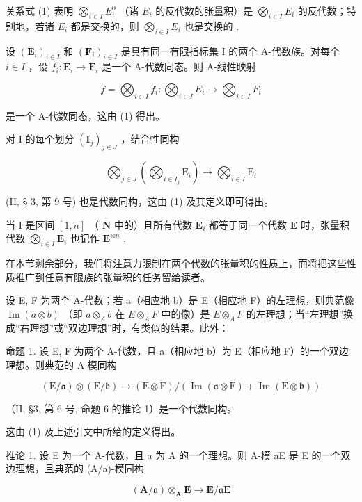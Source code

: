 关系式 (1) 表明 \(\bigotimes_{i\in I}E_i^0\) （诸 \(E_{i}\) 的反代数的张量积）是 \(\bigotimes_{i\in I}E_{i}\) 的反代数；特别地，若诸 \(E_{i}\) 都是交换的，则 \(\bigotimes_{i\in I}E_{i}\) 也是交换的 .

设 \((\mathbf{E}_i)_{i\in I}\) 和 \((\mathbf{F}_i)_{i\in I}\) 是具有同一有限指标集 I 的两个 A-代数族。对每个 \(i\in I\) ，设 \(f_{i}\colon \mathbf{E}_{i}\to \mathbf{F}_{i}\) 是一个 A-代数同态。则 A-线性映射

\[
f = \bigotimes_ {i \in I} f _ {i}: \bigotimes_ {i \in I} E _ {i} \rightarrow \bigotimes_ {i \in I} F _ {i}
\]

是一个 A-代数同态，这由 (1) 得出。

对 I 的每个划分 \((\mathbf{I}_{j})_{j\in J}\) ，结合性同构

\[
\bigotimes_ {j \in J} \left(\bigotimes_ {i \in I _ {j}} \mathrm{E} _ {i}\right)\rightarrow \bigotimes_ {i \in I} \mathrm{E} _ {i}
\]

(II, § 3, 第 9 号) 也是代数同构，这由 (1) 及其定义即可得出。

当 I 是区间 \([1, n]\) （ \(\mathbf{N}\) 中的）且所有代数 \(\mathbf{E}_i\) 都等于同一个代数 \(\mathbf{E}\) 时，张量积代数 \(\bigotimes_{i \in I} \mathbf{E}_i\) 也记作 \(\mathbf{E}^{\otimes n}\) .

在本节剩余部分，我们将注意力限制在两个代数的张量积的性质上，而将把这些性质推广到任意有限族的张量积的任务留给读者。

设 E, F 为两个 A-代数；若 a（相应地 b）是 E（相应地 F）的左理想，则典范像 \(\operatorname{Im}(a \otimes b)\) （即 \(a \otimes_{A} b\) 在 \(E \otimes_{A} F\) 中的像）是 \(E \otimes_{A} F\) 的左理想；当“左理想”换成“右理想”或“双边理想”时，有类似的结果。此外：

命题 1. 设 E, F 为两个 A-代数，且 a（相应地 b）为 E（相应地 F）的一个双边理想。则典范的 A-模同构

\[
(\mathrm{E} / \mathfrak {a}) \otimes (\mathrm{E} / \mathfrak {b}) \rightarrow (\mathrm{E} \otimes \mathrm{F}) / (\operatorname{Im} (\mathfrak {a} \otimes \mathrm{F}) + \operatorname{Im} (\mathrm{E} \otimes \mathfrak {b}))
\]

（II, §3, 第 6 号, 命题 6 的推论 1）是一个代数同构。

这由 (1) 及上述引文中所给的定义得出。

推论 1. 设 E 为一个 A-代数，且 a 为 A 的一个理想。则 A-模 aE 是 E 的一个双边理想，且典范的 (A/a)-模同构

\[
(\mathbf {A} / \mathfrak {a}) \otimes_ {\mathbf {A}} \mathbf {E} \rightarrow \mathbf {E} / \mathfrak {a} \mathbf {E}
\]

